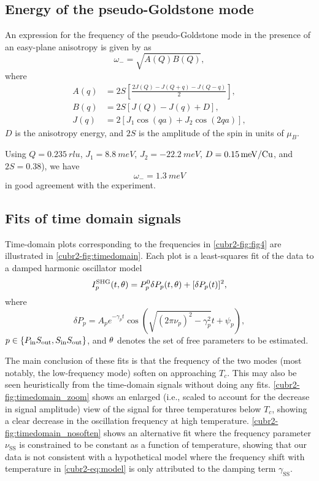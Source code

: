 \subsection{Energy of the pseudo-Goldstone mode}\label{cubr2-sup:anisotropyenergy}
An expression for the frequency of the pseudo-Goldstone mode in the presence of an easy-plane anisotropy is given by \citet{katsura_dynamical_2007} as
\begin{equation}
\omega_- = \sqrt{A(Q)B(Q)},
\end{equation}
where
\begin{align}
A(q) &= 2S\left[\frac{2J(Q)-J(Q+q)-J(Q-q)}{2}\right],\\
B(q) &= 2S\left[J(Q)-J(q)+D\right],\\
J(q) &= 2\left[J_1\cos(qa)+J_2\cos(2qa)\right],
\end{align}
$D$ is the anisotropy energy, and $2S$ is the amplitude of the spin in units of $\mu_B$.

Using $Q=\qty{0.235}{rlu}$\citep{zhao_cubr2_2012}, $J_1=\qty{8.8}{meV}$\citep{lebernegg_magnetism_2013}, $J_2=\qty{-22.2}{meV}$\citep{lebernegg_magnetism_2013}, $D=\qty{0.15}{meV/\ce{Cu}}$\citep{lee_investigation_2012}, and $2S=\num{0.38}$\citep{lee_investigation_2012}), we have
\begin{equation}
\omega_- = \qty{1.3}{meV}
\end{equation}
in good agreement with the experiment.

\subsection{Fits of time domain signals}\label{cubr2-sup:timedomain}
Time-domain plots corresponding to the frequencies in \cref{cubr2-fig:fig4} are illustrated in \cref{cubr2-fig:timedomain}.
Each plot is a least-squares fit of the data to a damped harmonic oscillator model
\begin{equation}
I^\mathrm{SHG}_p(t, \theta) = P^0_p\delta P_p(t, \theta)+[\delta P_p(t)]^2,
\end{equation}
where
\begin{equation}\label{cubr2-eq:model}
\delta P_p = A_pe^{-\gamma_p t}\cos\left(\sqrt{(2\pi\nu_p)^2-\gamma_p^2}t+\psi_p\right),
\end{equation}
$p \in \{P_\mathrm{in}S_\mathrm{out}, S_\mathrm{in}S_\mathrm{out}\}$, and $\theta$ denotes the set of free parameters to be estimated.

The main conclusion of these fits is that the frequency of the two modes (most notably, the low-frequency \SS mode) soften on approaching $T_c$.
This may also be seen heuristically from the time-domain signals without doing any fits.
\cref{cubr2-fig:timedomain_zoom} shows an enlarged (i.e., scaled to account for the decrease in signal amplitude) view of the \SS signal for three temperatures below $T_c$, showing a clear decrease in the oscillation frequency at high temperature.
\cref{cubr2-fig:timedomain_nosoften} shows an alternative fit where the frequency parameter $\nu_\mathrm{SS}$ is constrained to be constant as a function of temperature, showing that our data is not consistent with a hypothetical model where the frequency shift with temperature in \cref{cubr2-eq:model} is only attributed to the damping term $\gamma_\mathrm{SS}$.

